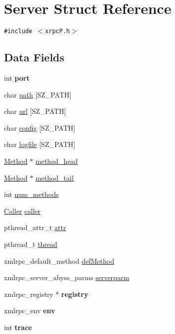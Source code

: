 \hypertarget{structServer}{
\section{Server Struct Reference}
\label{structServer}
}
{\tt \#include $<$xrpcP.h$>$}

\subsection*{Data Fields}
\begin{CompactItemize}
\item 
\hypertarget{structServer_926c9dae229a62b6d33fdbb41dca6d82}{
int \textbf{port}}
\label{structServer_926c9dae229a62b6d33fdbb41dca6d82}

\item 
char \hyperlink{structServer_3e5bdf6e881fe987617dbbe420ed39a7}{path} \mbox{[}SZ\_\-PATH\mbox{]}
\item 
char \hyperlink{structServer_732b4b0eb4208cc8618eeda41d35effa}{url} \mbox{[}SZ\_\-PATH\mbox{]}
\item 
char \hyperlink{structServer_25c424b3c00a12aefd80dd82dafa1f9f}{config} \mbox{[}SZ\_\-PATH\mbox{]}
\item 
char \hyperlink{structServer_520e88309f2f48106caa1fb6bacd9b3b}{logfile} \mbox{[}SZ\_\-PATH\mbox{]}
\item 
\hyperlink{structMethod}{Method} $\ast$ \hyperlink{structServer_0d3f35225f9d2bcb9350016948e77ada}{method\_\-head}
\item 
\hyperlink{structMethod}{Method} $\ast$ \hyperlink{structServer_baf5367f677cc45e2b46d08989a068e4}{method\_\-tail}
\item 
int \hyperlink{structServer_fd95ab28088415ee5900bd6bf70dc0a2}{num\_\-methods}
\item 
\hyperlink{structCaller}{Caller} \hyperlink{structServer_bac1edd9485d6c86e5d6273c9e7efe79}{caller}
\item 
pthread\_\-attr\_\-t \hyperlink{structServer_922879601b599ff38a9638a72da810fa}{attr}
\item 
pthread\_\-t \hyperlink{structServer_b30292985309c492e4ba0ebbf2a6934a}{thread}
\item 
xmlrpc\_\-default\_\-method \hyperlink{structServer_bafe10e20203238b2f957419066955be}{defMethod}
\item 
xmlrpc\_\-server\_\-abyss\_\-parms \hyperlink{structServer_62bc9dc3ae8328ac0781cc3c7cbe148c}{serverparm}
\item 
\hypertarget{structServer_039a46ab56a4118f4013ca22cf042e4a}{
xmlrpc\_\-registry $\ast$ \textbf{registry}}
\label{structServer_039a46ab56a4118f4013ca22cf042e4a}

\item 
\hypertarget{structServer_b50cdb19365000aa482374876aa55fec}{
xmlrpc\_\-env \textbf{env}}
\label{structServer_b50cdb19365000aa482374876aa55fec}

\item 
\hypertarget{structServer_16b8af9cb469718b3fdfd50fbe9fbc3a}{
int \textbf{trace}}
\label{structServer_16b8af9cb469718b3fdfd50fbe9fbc3a}

\end{CompactItemize}


